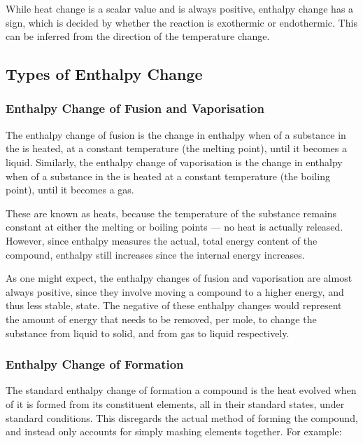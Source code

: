 			While heat change is a scalar value and is always positive, enthalpy change has a sign, which is decided by whether the reaction is
			exothermic or endothermic. This can be inferred from the direction of the temperature change.


		\pagebreak
		\subsection{Types of Enthalpy Change}

			\subsubsection{Enthalpy Change of Fusion and Vaporisation}

				The enthalpy change of fusion is the change in enthalpy when  of a substance in the  is heated,
				at a constant temperature (the melting point), until it becomes a liquid. Similarly, the enthalpy change of vaporisation is the
				change in enthalpy when  of a substance in the  is heated at a constant temperature
				(the boiling point), until it becomes a gas.

				These are known as  heats, because the temperature of the substance remains constant at either the melting or
				boiling points — no heat is actually released. However, since enthalpy measures the actual, total energy content of the compound,
				enthalpy still increases since the internal energy increases.

				As one might expect, the enthalpy changes of fusion and vaporisation are almost always positive, since they involve moving a
				compound to a higher energy, and thus less stable, state. The negative of these enthalpy changes would represent the amount
				of energy that needs to be removed, per mole, to change the substance from liquid to solid, and from gas to liquid respectively.



			\subsubsection{Enthalpy Change of Formation}

				The standard enthalpy change of formation a compound is the heat evolved when  of it is formed from its constituent
				elements, all in their standard states, under standard conditions. This disregards the actual method of forming the compound, and
				instead only accounts for simply mashing elements together. For example:

